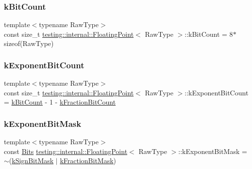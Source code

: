\subsubsection{\texorpdfstring{kBitCount}{kBitCount}}
{\footnotesize\ttfamily template$<$typename Raw\+Type$>$ \\
const size\+\_\+t \mbox{\hyperlink{classtesting_1_1internal_1_1FloatingPoint}{testing\+::internal\+::\+Floating\+Point}}$<$ Raw\+Type $>$\+::k\+Bit\+Count = 8$\ast$sizeof(Raw\+Type)\hspace{0.3cm}{\ttfamily [static]}}

\mbox{\label{classtesting_1_1internal_1_1FloatingPoint_a1973d843c00781053d3073daa8a40119}} 
\subsubsection{\texorpdfstring{kExponentBitCount}{kExponentBitCount}}
{\footnotesize\ttfamily template$<$typename Raw\+Type$>$ \\
const size\+\_\+t \mbox{\hyperlink{classtesting_1_1internal_1_1FloatingPoint}{testing\+::internal\+::\+Floating\+Point}}$<$ Raw\+Type $>$\+::k\+Exponent\+Bit\+Count = \mbox{\hyperlink{classtesting_1_1internal_1_1FloatingPoint_ab819d2e8f93e9e482373999f0f8d71b9}{k\+Bit\+Count}} -\/ 1 -\/ \mbox{\hyperlink{classtesting_1_1internal_1_1FloatingPoint_a0b756a6d2a4f5f5b41ca79651c06c043}{k\+Fraction\+Bit\+Count}}\hspace{0.3cm}{\ttfamily [static]}}

\mbox{\label{classtesting_1_1internal_1_1FloatingPoint_a66065dfc4d5f41100f686159637af23b}} 
\subsubsection{\texorpdfstring{kExponentBitMask}{kExponentBitMask}}
{\footnotesize\ttfamily template$<$typename Raw\+Type$>$ \\
const \mbox{\hyperlink{classtesting_1_1internal_1_1FloatingPoint_abf228bf6cd48f12c8b44c85b4971a731}{Bits}} \mbox{\hyperlink{classtesting_1_1internal_1_1FloatingPoint}{testing\+::internal\+::\+Floating\+Point}}$<$ Raw\+Type $>$\+::k\+Exponent\+Bit\+Mask = $\sim$(\mbox{\hyperlink{classtesting_1_1internal_1_1FloatingPoint_aca98b5ea6f2222a66a82e52421682efa}{k\+Sign\+Bit\+Mask}} $\vert$ \mbox{\hyperlink{classtesting_1_1internal_1_1FloatingPoint_a0ac75d4ffd24f14bca452abe8a718da1}{k\+Fraction\+Bit\+Mask}})\hspace{0.3cm}{\ttfamily [static]}}

